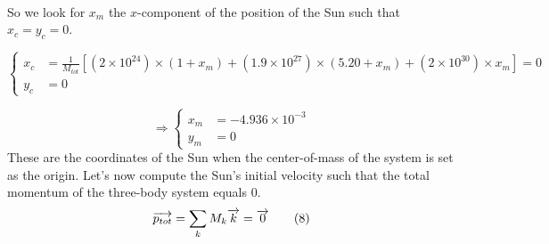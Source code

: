\documentclass[a4paper, twoside, 11pt]{report}
\theoremstyle{theorem}
\theoremstyle{remark}
\theoremstyle{exemple}
\begin{document}
            \paragraph{}So we look for $x_m$ the $x$-component of the position of the Sun such that $x_c=y_c=0$.
            
                \begin{equation*}
                    \left\{
                        \begin{aligned}
                            x_c &= \frac{1}{M_{tot}} [(2 \times 10^{24}) \times (1 + x_m) + (1.9 \times 10^{27}) \times (5.20 + x_m) + (2 \times 10^{30}) \times x_m] = 0 \\
                            y_c &= 0 
                        \end{aligned}
                    \right.
                \end{equation*}
                
                \begin{equation*}
                    \Longrightarrow \left\{ 
                        \begin{aligned}
                            x_m &= -4.936 \times 10^{-3}\\
                            y_m &= 0
                        \end{aligned}
                    \right.
                    \tag{7}
                \end{equation*}
            These are the coordinates of the Sun when the center-of-mass of the system is set as the origin. Let's now compute the Sun's initial velocity such that the total momentum of the three-body system equals 0.
                \begin{equation}
                    \overrightarrow{p_{tot}} = \sum\limits_{k} M_k \overrightarrow{k} = \overrightarrow{0} \\
                    \tag{8}
                \end{equation}
                
\end{document}
